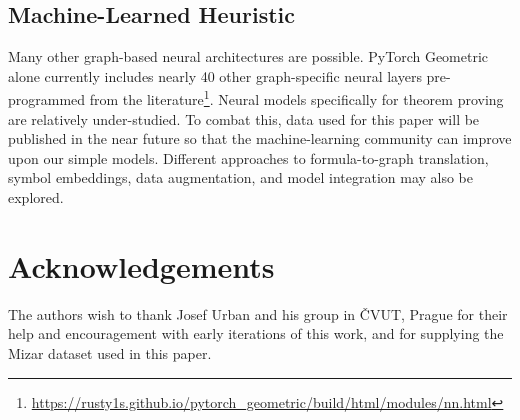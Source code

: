 \documentclass[runningheads]{llncs}
\begin{document}
\subsection{Machine-Learned Heuristic}
Many other graph-based neural architectures are possible.
PyTorch Geometric alone currently includes nearly 40 other graph-specific neural layers pre-programmed from the literature\footnote{\url{https://rusty1s.github.io/pytorch_geometric/build/html/modules/nn.html}}.
Neural models specifically for theorem proving are relatively under-studied.
To combat this, data used for this paper will be published in the near future so that the machine-learning community can improve upon our simple models.
Different approaches to formula-to-graph translation, symbol embeddings, data augmentation, and model integration may also be explored.

\section{Acknowledgements}
The authors wish to thank Josef Urban and his group in \v{C}VUT, Prague for their help and encouragement with early iterations of this work, and for supplying the Mizar dataset used in this paper.



\end{document}
